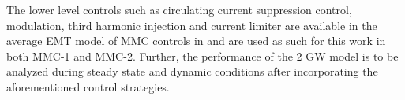 The lower level controls such as circulating current suppression control, modulation, third harmonic injection and current limiter are available in the average \gls{EMT} model of \gls{MMC} controls in \cite{vrana2013cigre} and are used as such for this work in both \gls{MMC}-1 and \gls{MMC}-2. Further, the performance of the 2 GW model is to be analyzed during steady state and dynamic conditions after incorporating the aforementioned control strategies.

